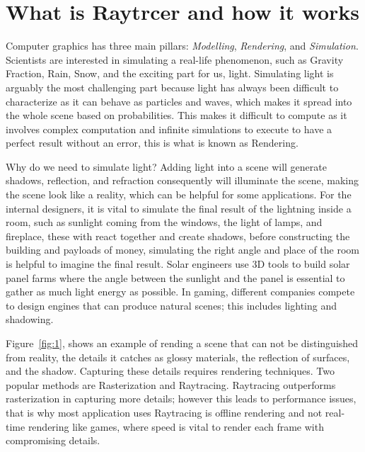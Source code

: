 \documentclass[11pt,a4paper]{article}
\begin{document}
	\section{What is Raytrcer and how it works}
	
	Computer graphics has three main pillars: \textit{Modelling}, \textit{Rendering}, and \textit{Simulation}. Scientists are interested in simulating a real-life phenomenon, such as Gravity Fraction, Rain, Snow, and the exciting part for us, light.  Simulating light is arguably the most challenging part because light has always been difficult to characterize as it can behave as particles and waves, which makes it spread into the whole scene based on probabilities. This makes it difficult to compute as it involves complex computation and infinite simulations to execute to have a perfect result without an error, this is what is known as Rendering.
	
	Why do we need to simulate light? Adding light into a scene will generate shadows, reflection, and refraction consequently will illuminate the scene, making the scene look like a reality, which can be helpful for some applications. For the internal designers, it is vital to simulate the final result of the lightning inside a room, such as sunlight coming from the windows, the light of lamps, and fireplace, these with react together and create shadows, before constructing the building and payloads of money, simulating the right angle and place of the room is helpful to imagine the final result. Solar engineers use 3D tools to build solar panel farms where the angle between the sunlight and the panel is essential to gather as much light energy as possible. In gaming, different companies compete to design engines that can produce natural scenes; this includes lighting and shadowing.  
	
	Figure~\ref{fig:1}, shows an example of rending a scene that can not be distinguished from reality, the details it catches as glossy materials, the reflection of surfaces, and the shadow. Capturing these details requires rendering techniques. Two popular methods are Rasterization and Raytracing. Raytracing outperforms rasterization in capturing more details; however this leads to performance issues, that is why most application uses Raytracing is offline rendering and not real-time rendering like games, where speed is vital to render each frame with compromising details. 
	
\end{document}

